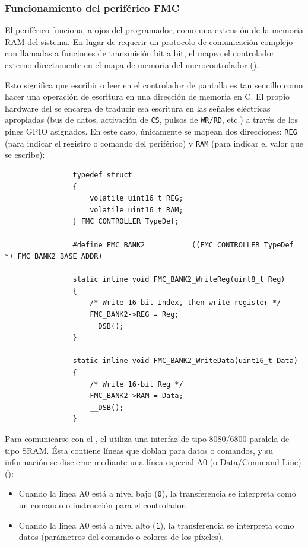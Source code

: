 \documentclass[../main.tex]{subfiles}
\begin{document}
        \subsubsection{Funcionamiento del periférico FMC}

            El periférico  funciona, a ojos del programador, como una extensión de la memoria RAM del sistema. En lugar de requerir un protocolo de comunicación complejo con llamadas a funciones de transmisión bit a bit, el  mapea el controlador externo directamente en el mapa de memoria del microcontrolador (\REFMAN[12.4]).

            Esto significa que escribir o leer en el controlador de pantalla es tan sencillo como hacer una operación de escritura en una dirección de memoria en C. El propio hardware del  se encarga de traducir esa escritura en las señales eléctricas apropiadas (bus de datos, activación de \texttt{CS}, pulsos de \texttt{WR/RD}, etc.) a través de los pines GPIO asignados. En este caso, únicamente se mapean dos direcciones: \texttt{REG} (para indicar el registro o comando del periférico) y \texttt{RAM} (para indicar el valor que se escribe):

            \begin{lstlisting}
                typedef struct
                {
                    volatile uint16_t REG;
                    volatile uint16_t RAM;
                } FMC_CONTROLLER_TypeDef;

                #define FMC_BANK2       	((FMC_CONTROLLER_TypeDef *) FMC_BANK2_BASE_ADDR)

                static inline void FMC_BANK2_WriteReg(uint8_t Reg)
                {
                    /* Write 16-bit Index, then write register */
                    FMC_BANK2->REG = Reg;
                    __DSB();
                }

                static inline void FMC_BANK2_WriteData(uint16_t Data)
                {
                    /* Write 16-bit Reg */
                    FMC_BANK2->RAM = Data;
                    __DSB();
                }
            \end{lstlisting}

            Para comunicarse con el \LCDMAN, el  utiliza una interfaz de tipo 8080/6800 paralela de tipo SRAM. Ésta contiene líneas que doblan para datos o comandos, y su información se discierne mediante una línea especial A0 (o Data/Command Line) (\BRDMAN[Table 14]):
            \begin{itemize}
                \item Cuando la línea A0 está a nivel bajo (\texttt{0}), la transferencia se interpreta como un comando o instrucción para el controlador.
                \item Cuando la línea A0 está a nivel alto (\texttt{1}), la transferencia se interpreta como datos (parámetros del comando o colores de los píxeles).
            \end{itemize}
\end{document}

